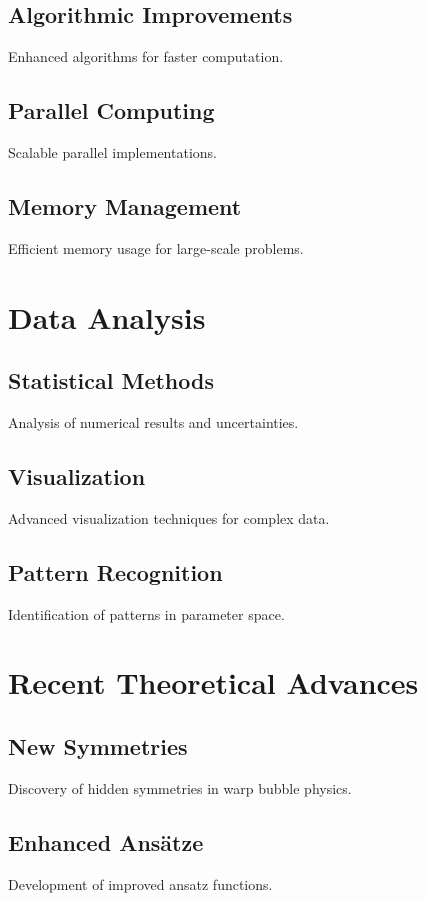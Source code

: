 \documentclass{article}
\begin{document}
\subsection{Algorithmic Improvements}
Enhanced algorithms for faster computation.

\subsection{Parallel Computing}
Scalable parallel implementations.

\subsection{Memory Management}
Efficient memory usage for large-scale problems.

\section{Data Analysis}

\subsection{Statistical Methods}
Analysis of numerical results and uncertainties.

\subsection{Visualization}
Advanced visualization techniques for complex data.

\subsection{Pattern Recognition}
Identification of patterns in parameter space.

\section{Recent Theoretical Advances}

\subsection{New Symmetries}
Discovery of hidden symmetries in warp bubble physics.

\subsection{Enhanced Ansätze}
Development of improved ansatz functions.
\end{document}
